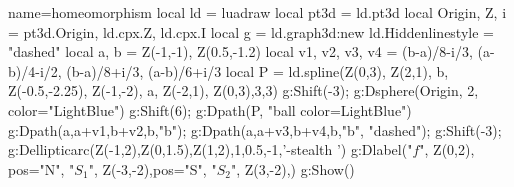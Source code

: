 \documentclass[border=5pt]{standalone}%
\begin{document}
\begin{luadraw}{name=homeomorphism}
local ld = luadraw
local pt3d = ld.pt3d
local Origin, Z, i = pt3d.Origin, ld.cpx.Z, ld.cpx.I
local g = ld.graph3d:new{}
ld.Hiddenlinestyle = "dashed"
local a, b = Z(-1,-1), Z(0.5,-1.2)
local v1, v2, v3, v4 = (b-a)/8-i/3, (a-b)/4-i/2, (b-a)/8+i/3, (a-b)/6+i/3
local P = ld.spline({Z(0,3), Z(2,1), b, Z(-0.5,-2.25), Z(-1,-2), a, Z(-2,1), Z(0,3)},3,3)
g:Shift(-3); g:Dsphere(Origin, 2, {color="LightBlue"})
g:Shift(6); g:Dpath(P, "ball color=LightBlue")
g:Dpath({a,a+v1,b+v2,b,"b"}); g:Dpath({a,a+v3,b+v4,b,"b"}, "dashed");
g:Shift(-3); g:Dellipticarc(Z(-1,2),Z(0,1.5),Z(1,2),1,0.5,-1,'-stealth ')
g:Dlabel("$f$", Z(0,2), {pos="N"}, "$S_1$", Z(-3,-2),{pos="S"}, "$S_2$", Z(3,-2),{})
g:Show()
\end{luadraw}
\end{document}
